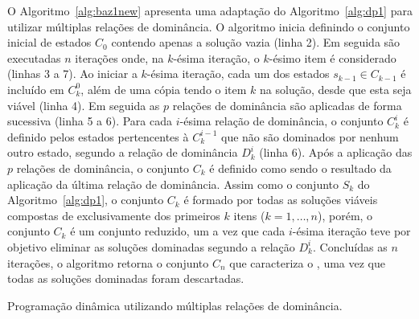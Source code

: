 O Algoritmo~\ref{alg:baz1new} apresenta uma adaptação do Algoritmo~\ref{alg:dp1}
para utilizar múltiplas relações de dominância.
O algoritmo inicia definindo o conjunto inicial de estados $C_0$ contendo apenas a
solução vazia (linha 2).
Em seguida são executadas $n$ iterações onde, na $k$-ésima iteração, o $k$-ésimo item
é considerado (linhas 3 a 7).
Ao iniciar a $k$-ésima iteração, cada um dos estados $s_{k-1} \in C_{k-1}$ é incluído em $C_k^0$,
além de uma cópia tendo o item $k$ na solução, desde que esta seja viável (linha 4).
Em seguida as $p$ relações de dominância são aplicadas de forma sucessiva (linha 5 a 6).
Para cada $i$-ésima relação de dominância, o conjunto $C_k^i$ é definido pelos
estados pertencentes à $C_k^{i-1}$ que não são dominados por nenhum outro estado,
segundo a relação de dominância $D^i_k$ (linha 6).
Após a aplicação das $p$ relações de dominância, o conjunto $C_k$ é definido
como sendo o resultado da aplicação da última relação de dominância.
Assim como o conjunto $S_k$ do Algoritmo~\ref{alg:dp1}, o conjunto $C_k$ é formado por todas as soluções
viáveis compostas de exclusivamente dos primeiros $k$ itens ($k = 1, \ldots, n$),
porém, o conjunto $C_k$ é um conjunto reduzido, um a vez que cada $i$-ésima iteração
teve por objetivo eliminar as soluções dominadas segundo a relação $D^i_k$.
Concluídas as $n$ iterações, o algoritmo retorna o conjunto $C_n$
que caracteriza o \paretoset{}, uma vez que todas as soluções dominadas foram descartadas.



\begin{algorithm}
  \footnotesize
  \caption{Programação dinâmica utilizando múltiplas relações de dominância.}
  \label{alg:baz1new}
  
\end{algorithm}



